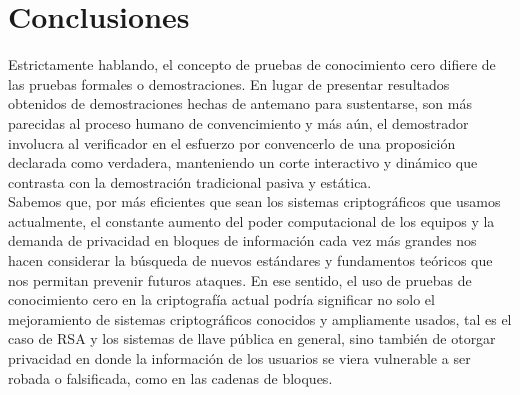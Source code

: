 \documentclass[oneside,10pt]{article}
\begin{document}
\section{Conclusiones}
Estrictamente hablando, el concepto de  pruebas de conocimiento cero difiere de las pruebas formales o demostraciones. En lugar de presentar resultados obtenidos de demostraciones hechas de antemano para sustentarse, son más parecidas al proceso humano de convencimiento y más aún, el demostrador involucra al verificador en el esfuerzo por convencerlo de una proposición declarada como verdadera, manteniendo un corte interactivo y dinámico que contrasta con la demostración tradicional pasiva y estática. \\
Sabemos que, por más eficientes que sean los sistemas criptográficos que usamos actualmente, el constante aumento del poder computacional de los equipos y la demanda de privacidad en bloques de información cada vez más grandes nos hacen considerar la búsqueda de nuevos estándares y fundamentos teóricos que nos permitan prevenir futuros ataques.  En ese sentido, el uso de pruebas de conocimiento cero en la criptografía actual podría significar no solo el mejoramiento de sistemas criptográficos conocidos y ampliamente usados, tal es el caso de RSA y los sistemas de llave pública en general, sino también de otorgar privacidad en donde la información de los usuarios se viera vulnerable a ser robada o falsificada, como en las cadenas de bloques. 
\end{document}
